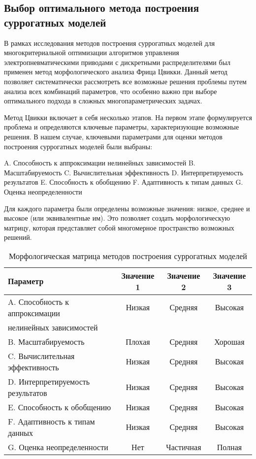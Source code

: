 \subsection{Выбор оптимального метода построения суррогатных моделей}\label{sec:ch4/sec2/subsec2}

В рамках исследования методов построения суррогатных моделей
для многокритериальной оптимизации алгоритмов управления
электропневматическими приводами с дискретными распределителями
был применен метод морфологического анализа Фрица Цвикки. Данный
метод позволяет систематически рассмотреть все возможные решения
проблемы путем анализа всех комбинаций параметров, что особенно важно
при выборе оптимального подхода в сложных многопараметрических задачах.

Метод Цвикки включает в себя несколько этапов. На первом этапе
формулируется проблема и определяются ключевые параметры,
характеризующие возможные решения. В нашем случае, ключевыми
параметрами для оценки методов построения суррогатных моделей были выбраны:

A. Способность к аппроксимации нелинейных зависимостей
B. Масштабируемость
C. Вычислительная эффективность
D. Интерпретируемость результатов
E. Способность к обобщению
F. Адаптивность к типам данных
G. Оценка неопределенности

Для каждого параметра были определены возможные значения:
низкое, среднее и высокое (или эквивалентные им).
Это позволяет создать морфологическую матрицу,
которая представляет собой многомерное пространство возможных решений.

\begin{table}[h]
    \centering
    \caption{Морфологическая матрица методов построения суррогатных моделей}
    \begin{tabular}{lccc}
        \midrule
        Параметр                          & Значение 1 & Значение 2 & Значение 3 \\
        \midrule
        A. Способность к аппроксимации    & Низкая     & Средняя    & Высокая    \\
        нелинейных зависимостей           &            &            &            \\

        B. Масштабируемость               & Плохая     & Средняя    & Хорошая    \\
        C. Вычислительная эффективность   & Низкая     & Средняя    & Высокая    \\
        D. Интерпретируемость результатов & Низкая     & Средняя    & Высокая    \\
        E. Способность к обобщению        & Низкая     & Средняя    & Высокая    \\
        F. Адаптивность к типам данных    & Низкая     & Средняя    & Высокая    \\
        G. Оценка неопределенности        & Нет        & Частичная  & Полная     \\
        \midrule
    \end{tabular}
    \label{tab:morphological_matrix}
\end{table}

